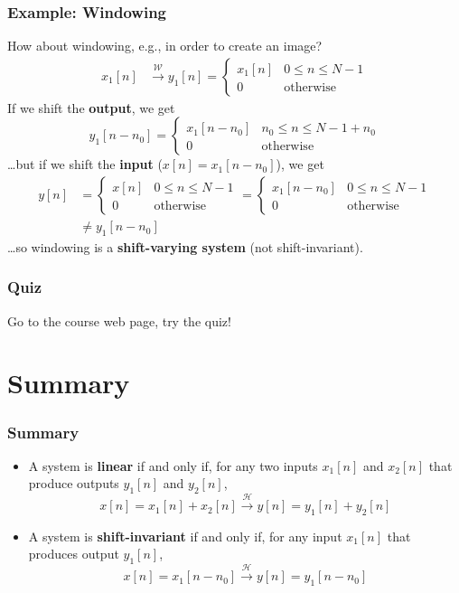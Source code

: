 \documentclass{beamer}
\begin{document}
\begin{frame}
  \frametitle{Example: Windowing}

  How about windowing, e.g., in order to create an image?
  \begin{align*}
    x_1[n] &\stackrel{\mathcal W}{\longrightarrow} y_1[n]=
    \begin{cases}
      x_1[n] & 0\le n\le N-1\\
      0 & \mbox{otherwise}
    \end{cases}
  \end{align*}
  If we shift the {\bf output}, we get
  \[
  y_1[n-n_0] = 
  \begin{cases}
    x_1[n-n_0] & n_0\le n\le N-1+n_0\\
    0 & \mbox{otherwise}
  \end{cases}
  \]
  \ldots but if we shift the {\bf input} ($x[n]=x_1[n-n_0]$), we get
  \begin{align*}
  y[n]&=
  \begin{cases}
    x[n] & 0\le n\le N-1\\
    0 & \mbox{otherwise}
  \end{cases}
  =
  \begin{cases}
    x_1[n-n_0] & 0\le n\le N-1\\
    0 & \mbox{otherwise}
  \end{cases}\\
  &\ne y_1[n-n_0]
  \end{align*}
  \ldots so windowing is a {\bf shift-varying system} (not shift-invariant).
\end{frame}


\begin{frame}
  \frametitle{Quiz}

  Go to the course web page, try the quiz!
\end{frame}

\section[Summary]{Summary}
\setcounter{subsection}{1}

\begin{frame}
  \frametitle{Summary}
  \begin{itemize}
  \item A system is {\bf linear} if and only if, for any two inputs
    $x_1[n]$ and $x_2[n]$ that produce outputs $y_1[n]$ and $y_2[n]$,
    \[
    x[n]=x_1[n]+x_2[n] \stackrel{\mathcal H}{\longrightarrow}  y[n]=y_1[n]+y_2[n]
    \]
  \item A system is {\bf shift-invariant} if and only if, for any input
    $x_1[n]$ that produces output $y_1[n]$,
    \[
    x[n]=x_1[n-n_0] \stackrel{\mathcal H}{\longrightarrow}  y[n]=y_1[n-n_0]
    \]
  \end{itemize}
\end{frame}
    
\end{document}
